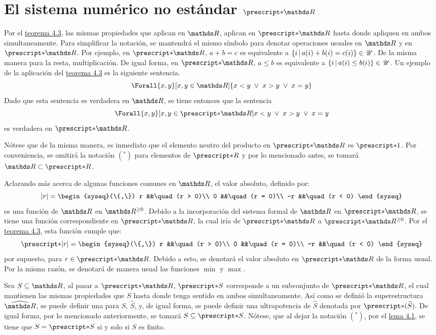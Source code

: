 \section{El sistema numérico no estándar \texorpdfstring{$\st{\R}$}{R}}

Por el \hyperref[theo:FT]{teorema 4.3}, las mismas propiedades que aplican
en $\R$, aplican en $\st{\R}$ hasta donde apliquen en ambos simultaneamente.
Para simplificar la notación, se mantendrá el mismo símbolo para
denotar operaciones usuales en $\R$ y en $\st{\R}$.
Por ejemplo, en $\st{\R}$, $a + b = c$ es equivalente a
$\left\{i\,\middle|\,a(i) + b(i) = c(i)\right\}\in\mathscr{U}$. De la misma manera para la
resta, multiplicación. De igual forma, en $\st{\R}$, $a \leq b$ es
equivalente a $\left\{i\,\middle|\,a(i)\leq b(i)\right\}\in\mathscr{U}$. Un ejemplo de la
aplicación del \hyperref[theo:FT]{teorema 4.3} es la siguiente sentencia.
\[\Forall{x,y}[x,y\in\R]{x<y \;\lor\; x>y \;\lor\; x=y}\]
Dado que esta sentencia es verdadera en $\R$, se tiene entonces que la
sentencia
\[\Forall{x,y}[x,y\in\st{\R}]{x<y \;\lor\; x>y \;\lor\; x=y}\]
es verdadera en $\st{\R}$.

Nótese que de la misma manera, es inmediato que el elemento neutro del
producto en $\st{\R}$ es $\st{1}$. Por conveniencia, se omitirá la notación
$({^*})$ para elementos de $\st{R}$ y por lo mencionado antes,
se tomará $\R \subset \st{R}$.

Aclarando más acerca de algunas funciones comunes en $\R$, el valor
absoluto, definido por:
\[
  |r| =
  \begin{syseq}(\{,\})
    r   &&\quad (r > 0)\\
    0   &&\quad (r = 0)\\
    -r  &&\quad (r < 0)
  \end{syseq}
\]
es una función de $\R$ en $\R^{\geq 0}$. Debido a la incorporación
del sistema formal de $\R$ en $\st{\R}$, se tiene una función
correspondiente en $\st{\R}$, la cual iría de $\st{\R}$ a
$\st{\R^{\geq 0}}$. Por el \hyperref[theo:FT]{teorema 4.3}, esta función
cumple que:
\[
  \st{|r|} =
  \begin{syseq}(\{,\})
    r   &&\quad (r > 0)\\
    0   &&\quad (r = 0)\\
    -r  &&\quad (r < 0)
  \end{syseq}
\]
por supuesto, para $r\in\st{\R}$. Debido a esto, se denotará el valor
absoluto en $\st{\R}$ de la forma usual. Por la misma razón, se denotará
de manera usual las funciones $\min$ y $\max$.

Sea $S\subseteq\R$, al pasar a $\st{\R}$, $\st{S}$ corresponde a un
subconjunto de $\st{\R}$, el cual mantienen las mismas propiedades que $S$
hasta donde tenga sentido en ambos simultaneamente. Así como se definió
la superestructura $\Rh$, se puede definir una para $S$, $\widehat{S}$, y,
de igual forma, se puede definir una ultrapotencia de $\widehat{S}$ denotada
por $\st{(\widehat{S})}$. De igual forma, por lo mencionado anteriormente,
se tomará $S\subseteq\st{S}$. Nótese, que al dejar la notación $({^*})$,
por el \hyperref[lema:stR]{lema 4.1}, se tiene que $S=\st{S}$ si y solo
si $S$ es finito.

